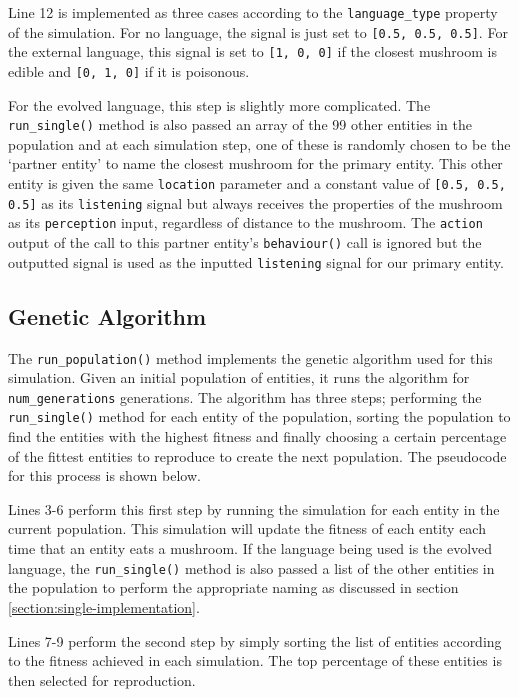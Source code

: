 \documentclass[12pt,a4paper,twoside,openright]{report}
\begin{document}
Line 12 is implemented as three cases according to the \texttt{language\_type} property of the simulation. For no language, the signal is just set to \texttt{[0.5, 0.5, 0.5]}. For the external language, this signal is set to \texttt{[1, 0, 0]} if the closest mushroom is edible and \texttt{[0, 1, 0]} if it is poisonous.

For the evolved language, this step is slightly more complicated. The \texttt{run\_single()} method is also passed an array of the 99 other entities in the population and at each simulation step, one of these is randomly chosen to be the `partner entity' to name the closest mushroom for the primary entity. This other entity is given the same \texttt{location} parameter and a constant value of \texttt{[0.5, 0.5, 0.5]} as its \texttt{listening} signal but always receives the properties of the mushroom as its \texttt{perception} input, regardless of distance to the mushroom. The \texttt{action} output of the call to this partner entity's \texttt{behaviour()} call is ignored but the outputted signal is used as the inputted \texttt{listening} signal for our primary entity.

\subsection{Genetic Algorithm}

The \texttt{run\_population()} method implements the genetic algorithm used for this simulation. Given an initial population of entities, it runs the algorithm for \texttt{num\_generations} generations. The algorithm has three steps; performing the \texttt{run\_single()} method for each entity of the population, sorting the population to find the entities with the highest fitness and finally choosing a certain percentage of the fittest entities to reproduce to create the next population. The pseudocode for this process is shown below.

Lines 3-6 perform this first step by running the simulation for each entity in the current population. This simulation will update the fitness of each entity each time that an entity eats a mushroom. If the language being used is the evolved language, the \texttt{run\_single()} method is also passed a list of the other entities in the population to perform the appropriate naming as discussed in section \ref{section:single-implementation}.

Lines 7-9 perform the second step by simply sorting the list of entities according to the fitness achieved in each simulation. The top percentage of these entities is then selected for reproduction.
\end{document}
